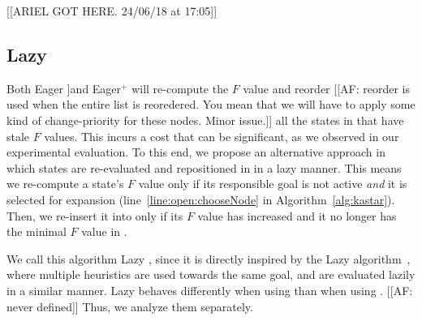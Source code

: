 

[[ARIEL GOT HERE. 24/06/18 at 17:05]]

\subsection{Lazy \kastar}


Both Eager \kastar [[AF: you mean without the responsible goal??, define this]]and Eager$^+$ \kastar will re-compute the $F$ value and reorder [[AF: reorder is used when the entire list is reoredered. You mean that we will have to apply some kind of change-priority for these nodes. Minor issue.]] all the states in \open that have stale $F$ values.
This incurs a cost that can be significant, as we observed in our experimental evaluation.
To this end, we propose an alternative approach in which states are re-evaluated and repositioned in \open in a lazy manner.
This means we re-compute a state's $F$ value only if its responsible goal is not active \emph{and} it is selected for expansion (line~\ref{line:open:chooseNode} in Algorithm~\ref{alg:kastar}).
Then, we re-insert it into \open only if its $F$ value has increased and it no longer has the minimal $F$ value in \open.


We call this algorithm Lazy \kastar, since it is directly inspired by the Lazy \astar algorithm~\cite{betzalel2015typeSystem,tolpin2013toward}, where multiple heuristics are used towards the same goal, and are evaluated lazily in a similar manner.
Lazy \kastar behaves differently when using \maxf than when using \minf. [[AF: never defined]]
Thus, we analyze them separately.


